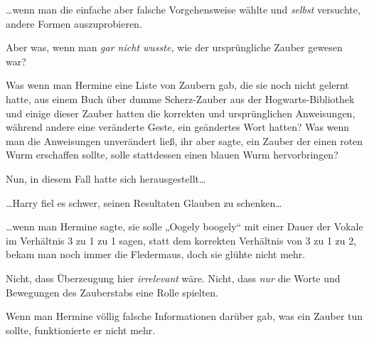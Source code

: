 …wenn man die einfache aber falsche Vorgehensweise wählte und \emph{selbst} versuchte, andere Formen auszuprobieren.

Aber was, wenn man \emph{gar nicht wusste,} wie der ursprüngliche Zauber gewesen war?

Was wenn man Hermine eine Liste von Zaubern gab, die sie noch nicht gelernt hatte, aus einem Buch über dumme Scherz-Zauber aus der Hogwarts-Bibliothek und einige dieser Zauber hatten die korrekten und ursprünglichen Anweisungen, während andere eine veränderte Geste, ein geändertes Wort hatten? Was wenn man die Anweisungen unverändert ließ, ihr aber sagte, ein Zauber der einen roten Wurm erschaffen sollte, solle stattdessen einen blauen Wurm hervorbringen?

Nun, in diesem Fall hatte sich herausgestellt…

…Harry fiel es schwer, seinen Resultaten Glauben zu schenken…

…wenn man Hermine sagte, sie solle „Oogely boogely“ mit einer Dauer der Vokale im Verhältnis 3 zu 1 zu 1 sagen, statt dem korrekten Verhältnis von 3 zu 1 zu 2, bekam man noch immer die Fledermaus, doch sie glühte nicht mehr.

Nicht, dass Überzeugung hier \emph{irrelevant} wäre. Nicht, dass \emph{nur} die Worte und Bewegungen des Zauberstabs eine Rolle spielten.

Wenn man Hermine völlig falsche Informationen darüber gab, was ein Zauber tun sollte, funktionierte er nicht mehr.

